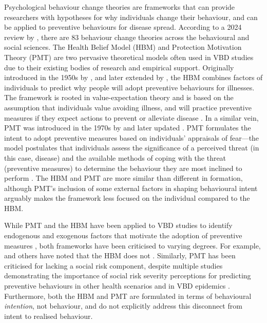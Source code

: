 Psychological behaviour change theories are frameworks that can provide researchers with hypotheses for why individuals change their behaviour, and can be applied to preventive behaviours for disease spread. According to a 2024 review by \citet{vande_velde_integrated_2024}, there are 83 behaviour change theories across the behavioural and social sciences. The Health Belief Model (HBM) and Protection Motivation Theory (PMT) are two pervasive theoretical models often used in VBD studies due to their existing bodies of research and empirical support. Originally introduced in the 1950s by \citet{hochbaum_public_1958}, and later extended by \citet{becker_health_1974}, the HBM combines factors of individuals to predict why people will adopt preventive behaviours for illnesses. The framework is rooted in value-expectation theory and is based on the assumption that individuals value avoiding illness, and will practice preventive measures if they expect actions to prevent or alleviate disease \cite{champion_health_2015}. In a similar vein, PMT was introduced in the 1970s by \citet{rogers_protection_1975} and later updated \cite{rogers_cognitive_1983}. PMT formulates the intent to adopt preventive measures based on individuals' appraisals of fear---the model postulates that individuals assess the significance of a perceived threat (in this case, disease) and the available methods of coping with the threat (preventive measures) to determine the behaviour they are most inclined to perform \cite{norman_protection_2015}. The HBM and PMT are more similar than different in formation, although PMT's inclusion of some external factors in shaping behavioural intent arguably makes the framework less focused on the individual compared to the HBM.

While PMT and the HBM have been applied to VBD studies to identify endogenous and exogenous factors that motivate the adoption of preventive measures \cite{vande_velde_integrated_2024, vizanko_modeling_2024, donohoe_tick-borne_2018, ghahremani_effect_2014}, both frameworks have been criticised to varying degrees. For example, \citet{bunton_theories_1991} and others have noted that the HBM does not  \cite{williams_role_2010}. Similarly, PMT has been criticised for lacking a social risk component, despite multiple studies demonstrating the importance of social risk severity perceptions for predicting preventive behaviours in other health scenarios \cite{pechmann_what_2003} and in VBD epidemics \cite{lopes-rafegas_contribution_2023, vande_velde_integrated_2024}. Furthermore, both the HBM and PMT are formulated in terms of behavioural \textit{intention}, not behaviour, and do not explicitly address this disconnect from intent to realised behaviour.

